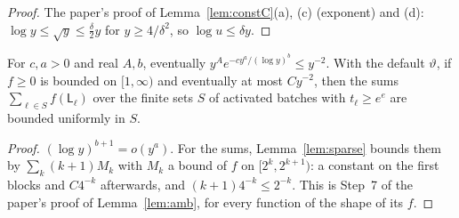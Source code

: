 \documentclass[11pt]{article}
\begin{document}
\begin{proof}
The paper's proof of Lemma~\ref{lem:constC}(a), (c) (exponent) and (d): $\log y\le\sqrt y\le\frac\delta2y$ for
$y\ge4/\delta^2$, so $\log u\le\delta y$.
\end{proof}

\begin{lemma}\label{flem:amb-series}
For $c,a>0$ and real $A,b$, eventually $y^Ae^{-cy^a/(\log y)^b}\le y^{-2}$. With the default $\vartheta$, if
$f\ge0$ is bounded on $[1,\infty)$ and eventually at most $Cy^{-2}$, then the sums
$\sum_{\ell\in S}f(\mathsf L_\ell)$ over the finite sets $S$ of activated batches with $t_\ell\ge e^e$ are bounded
uniformly in $S$.
\end{lemma}

\begin{proof}
$(\log y)^{b+1}=o(y^a)$. For the sums, Lemma~\ref{lem:sparse} bounds them by $\sum_k(k+1)M_k$ with $M_k$ a bound
of $f$ on $[2^k,2^{k+1})$: a constant on the first blocks and $C4^{-k}$ afterwards, and
$(k+1)4^{-k}\le2^{-k}$. This is Step~7 of the paper's proof of Lemma~\ref{lem:amb}, for every function
of the shape of its $f$.
\end{proof}
\end{document}
